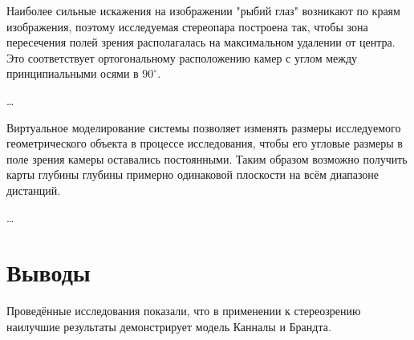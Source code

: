 Наиболее сильные искажения на изображении "рыбий глаз" возникают по краям изображения, поэтому исследуемая стереопара построена так,
чтобы зона пересечения полей зрения располагалась на максимальном удалении от центра. Это соответствует ортогональному расположению
камер с углом между принципиальными осями в $90^\circ$. 

\dots

Виртуальное моделирование системы позволяет изменять размеры исследуемого геометрического объекта в процессе исследования, чтобы его
угловые размеры в поле зрения камеры оставались постоянными. Таким образом возможно получить карты глубины глубины примерно одинаковой 
плоскости на всём диапазоне дистанций. 

\dots




\section{Выводы}
\label{conclusion}


Проведённые исследования показали, что в применении к стереозрению наилучшие результаты демонстрирует модель Канналы и Брандта.  

\newpage




